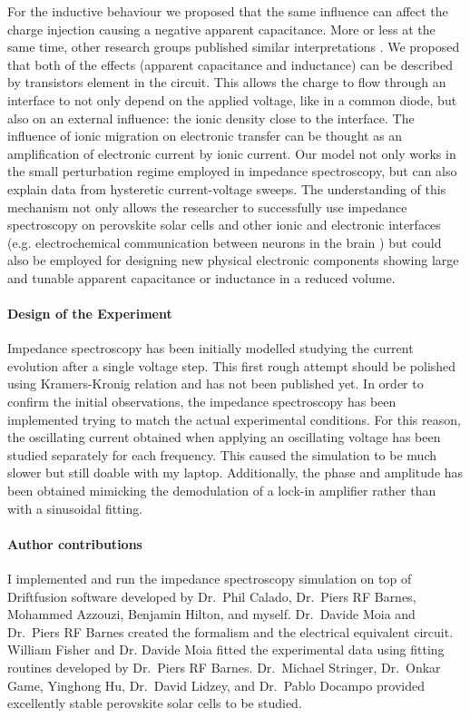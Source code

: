 For the inductive behaviour we proposed that the same influence can affect the charge injection causing a negative apparent capacitance.
More or less at the same time, other research groups published similar interpretations \cite{Ebadi2019,Jacobs2018}.
We proposed that both of the effects (apparent capacitance and inductance) can be described by transistors element in the circuit.
This allows the charge to flow through an interface to not only depend on the applied voltage, like in a common diode, but also on an external influence: the ionic density close to the interface.
The influence of ionic migration on electronic transfer can be thought as an amplification of electronic current by ionic current.
Our model not only works in the small perturbation regime employed in impedance spectroscopy, but can also explain data from hysteretic current\hyp{}voltage sweeps.
The understanding of this mechanism not only allows the researcher to successfully use impedance spectroscopy on perovskite solar cells and other ionic and electronic interfaces (e.g. electrochemical communication between neurons in the brain \cite{Cole1956}) but could also be employed for designing new physical electronic components showing large and tunable apparent capacitance or inductance in a reduced volume.

\paragraph{Design of the Experiment}
Impedance spectroscopy has been initially modelled studying the current evolution after a single voltage step.
This first rough attempt should be polished using Kramers\hyp{}Kronig relation and has not been published yet.
In order to confirm the initial observations, the impedance spectroscopy has been implemented trying to match the actual experimental conditions.
For this reason, the oscillating current obtained when applying an oscillating voltage has been studied separately for each frequency.
This caused the simulation to be much slower but still doable with my laptop.
Additionally, the phase and amplitude has been obtained mimicking the demodulation of a lock-in amplifier rather than with a sinusoidal fitting.

\paragraph{Author contributions}
I implemented and run the impedance spectroscopy simulation on top of Driftfusion software developed by Dr.\ Phil Calado, Dr.\ Piers RF Barnes, Mohammed Azzouzi, Benjamin Hilton, and myself.
Dr.\ Davide Moia and Dr.\ Piers RF Barnes created the formalism and the electrical equivalent circuit.
William Fisher and Dr. Davide Moia fitted the experimental data using fitting routines developed by Dr.\ Piers RF Barnes.
Dr.\ Michael Stringer, Dr.\ Onkar Game, Yinghong Hu, Dr.\ David Lidzey, and Dr.\ Pablo Docampo provided excellently stable perovskite solar cells to be studied.

